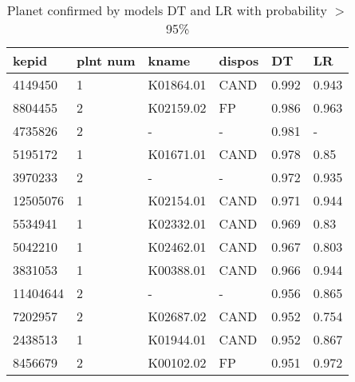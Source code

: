 \begin{table}[!htbp]
 \centering
 \caption{Planet confirmed by models DT and LR with probability $>$ 95\%}
 \label{dataDTLRcreftab} 
  \begin{tabular}
{| 
 p{}| 
 p{}| 
 p{}| 
 p{}| 
 p{}| 
 p{}| 
}\hline 
\textbf{kepid} &\textbf{plnt num} &\textbf{kname} &\textbf{dispos} &\textbf{DT} &\textbf{LR} \\ \hline 
4149450 &1 &K01864.01 &CAND &0.992 &0.943 \\ \hline 
8804455 &2 &K02159.02 &FP &0.986 &0.963 \\ \hline 
4735826 &2 &- &- &0.981 &- \\ \hline 
5195172 &1 &K01671.01 &CAND &0.978 &0.85 \\ \hline 
3970233 &2 &- &- &0.972 &0.935 \\ \hline 
12505076 &1 &K02154.01 &CAND &0.971 &0.944 \\ \hline 
5534941 &1 &K02332.01 &CAND &0.969 &0.83 \\ \hline 
5042210 &1 &K02462.01 &CAND &0.967 &0.803 \\ \hline 
3831053 &1 &K00388.01 &CAND &0.966 &0.944 \\ \hline 
11404644 &2 &- &- &0.956 &0.865 \\ \hline 
7202957 &2 &K02687.02 &CAND &0.952 &0.754 \\ \hline 
2438513 &1 &K01944.01 &CAND &0.952 &0.867 \\ \hline 
8456679 &2 &K00102.02 &FP &0.951 &0.972 \\ \hline 
\end{tabular} 
\end{table}